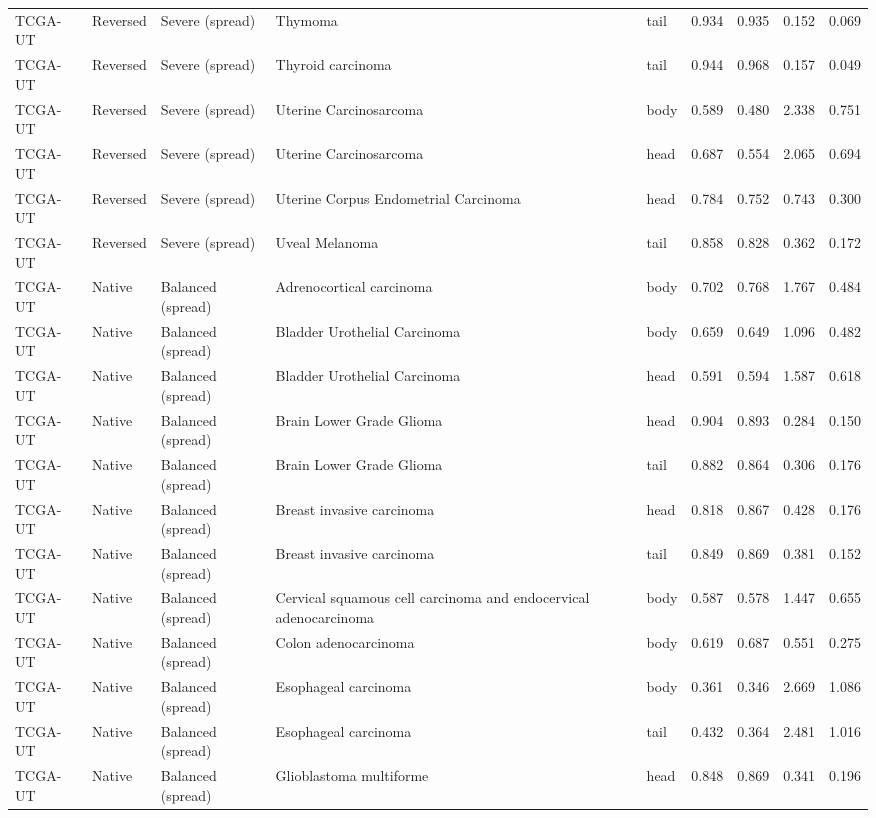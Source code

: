 \begin{longtable}{lllllrrrr}
TCGA-UT & Reversed & Severe (spread) & Thymoma & tail & 0.934 & 0.935 & 0.152 & 0.069 \\
TCGA-UT & Reversed & Severe (spread) & Thyroid carcinoma & tail & 0.944 & 0.968 & 0.157 & 0.049 \\
TCGA-UT & Reversed & Severe (spread) & Uterine Carcinosarcoma & body & 0.589 & 0.480 & 2.338 & 0.751 \\
TCGA-UT & Reversed & Severe (spread) & Uterine Carcinosarcoma & head & 0.687 & 0.554 & 2.065 & 0.694 \\
TCGA-UT & Reversed & Severe (spread) & Uterine Corpus Endometrial Carcinoma & head & 0.784 & 0.752 & 0.743 & 0.300 \\
TCGA-UT & Reversed & Severe (spread) & Uveal Melanoma & tail & 0.858 & 0.828 & 0.362 & 0.172 \\
TCGA-UT & Native & Balanced (spread) & Adrenocortical carcinoma & body & 0.702 & 0.768 & 1.767 & 0.484 \\
TCGA-UT & Native & Balanced (spread) & Bladder Urothelial Carcinoma & body & 0.659 & 0.649 & 1.096 & 0.482 \\
TCGA-UT & Native & Balanced (spread) & Bladder Urothelial Carcinoma & head & 0.591 & 0.594 & 1.587 & 0.618 \\
TCGA-UT & Native & Balanced (spread) & Brain Lower Grade Glioma & head & 0.904 & 0.893 & 0.284 & 0.150 \\
TCGA-UT & Native & Balanced (spread) & Brain Lower Grade Glioma & tail & 0.882 & 0.864 & 0.306 & 0.176 \\
TCGA-UT & Native & Balanced (spread) & Breast invasive carcinoma & head & 0.818 & 0.867 & 0.428 & 0.176 \\
TCGA-UT & Native & Balanced (spread) & Breast invasive carcinoma & tail & 0.849 & 0.869 & 0.381 & 0.152 \\
TCGA-UT & Native & Balanced (spread) & Cervical squamous cell carcinoma and endocervical adenocarcinoma & body & 0.587 & 0.578 & 1.447 & 0.655 \\
TCGA-UT & Native & Balanced (spread) & Colon adenocarcinoma & body & 0.619 & 0.687 & 0.551 & 0.275 \\
TCGA-UT & Native & Balanced (spread) & Esophageal carcinoma & body & 0.361 & 0.346 & 2.669 & 1.086 \\
TCGA-UT & Native & Balanced (spread) & Esophageal carcinoma & tail & 0.432 & 0.364 & 2.481 & 1.016 \\
TCGA-UT & Native & Balanced (spread) & Glioblastoma multiforme & head & 0.848 & 0.869 & 0.341 & 0.196 \\

\end{longtable}
